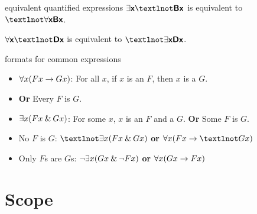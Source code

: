 
\begin{factboxy-width}[width=7cm]{equivalent quantified expressions}
$\exists \meta{x} ¬\meta{Bx} $ is equivalent to $¬\forall \meta{x Bx}$.\medskip

$\forall \meta{x} ¬\meta{Dx}$ is equivalent to $¬\exists \meta{x Dx}$.
\end{factboxy-width}


\begin{factboxy}{formats for common expressions}
\begin{itemize}
  \setlength{\itemsep}{1pt}
  \setlength{\parskip}{0pt}
  \setlength{\parsep}{0pt}
  \setlength{\itemindent}{-1cm}
\item[] $\forall x(Fx \rightarrow Gx)$: For all $x$, if $x$ is an $F$, then $x$ is a $G$. 
\item[] \hspace{24mm}\textbf{Or} Every $F$ is $G$.\medskip
\item[] $\exists x(Fx \mathbin{\&} Gx)$: For some $x$, $x$ is an $F$ and a $G$. \textbf{Or} Some $F$ is $G$.
\medskip
\item[] No $F$ is $G$: $¬\exists x(Fx \eand Gx) $ \textbf{or} $\forall x(Fx \eif ¬Gx)$\medskip
\item[] Only $F$s are $G$s: ${\neg} \exists x(Gx \mathbin{\&} {\neg} Fx)$ \textbf{or} $\forall x(Gx \rightarrow Fx)$
\end{itemize}
\end{factboxy}


\section{Scope}

